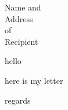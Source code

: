 \documentclass[fontsize=12pt, paper=a4]{scrlttr2}
\begin{document}
\begin{letter}{Name and \\ Address \\ of \\ Recipient}

\opening{hello}  %

here is my letter

\closing{regards} %

\end{letter}
\end{document}
